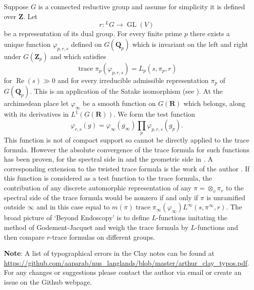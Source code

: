\documentclass[11pt]{amsart}
\def\Q{\mathbf Q}
\def\R{\mathbf R}
\def\Z{\mathbf Z}
\def\gl{\operatorname{GL}}
\def\Lone{L^1}
\def\Re{\operatorname{Re}}
\def\trace{\operatorname{trace}}
\theoremstyle{remark}
\begin{document}
Suppose $G$ is a connected reductive group and assume for simplicity it is defined over $\Z$. Let
\[ r : {}^LG \to \gl(V) \]
be a representation of its dual group. For every finite prime $p$ there exists a unique function $\varphi_{p, r, s}$ defined on $G(\Q_p)$ which is invariant on the left and right under $G(\Z_p)$ and which satisfies
\[ \trace \pi_p(\varphi_{p, r, s}) = L_p(s, \pi_p, r) \]
for $\Re(s) \gg 0$ and for every irreducible admissible representation $\pi_p$ of $G(\Q_p)$. This is an application of the Satake isomorphism (see \cite{MR3220933}). At the archimedean place let $\varphi_\infty$ be a smooth function on $G(\R)$ which belongs, along with its derivatives in $\Lone(G(\R))$. We form the test function
\[ \varphi_{r, s}(g) = \varphi_\infty(g_\infty) \displaystyle\prod_p \varphi_{p, r, s}(g_p). \]
This function is not of compact support so cannot be directly applied to the trace formula. However the absolute convergence of the trace formula for such functions has been proven, for the spectral side in \cite{FLM} and the geometric side in \cite{FL16}. A corresponding extension to the twisted trace formula is the work of the author \cite{Par19}. If this function is considered as a test function to the trace formula, the contribution of any discrete automorphic representation of any $\pi = \otimes_v \pi_v$ to the spectral side of the trace formula would be nonzero if and only if $\pi$ is unramified outside $\infty$ and in this case equal to $m(\pi) \trace \pi_\infty(\varphi_\infty) L^\infty(s, \pi^\infty, r)$. The broad picture of `Beyond Endoscopy' is to define $L$-functions imitating the method of Godement-Jacquet and weigh the trace formula by $L$-functions and then compare $r$-trace formulas on different groups. 

\textbf{Note}: A list of typographical errors in the Clay notes can be found at \url{https://github.com/aaparab/nus_langlands/blob/master/arthur_clay_typos.pdf}. For any changes or suggestions please contact the author via email or create an issue on the Github webpage. 

\end{document}

